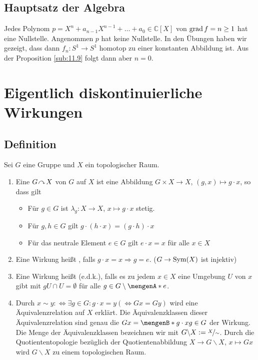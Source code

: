 \subsection{Hauptsatz der Algebra} %
\label{sub:1121}
Jedes Polynom $p = X^n + a_{n-1} X^{n-1} + \ldots  + a_0 \in \mathds{C}[X]$ von $\operatorname{grad} f = n \ge 1$ hat eine Nullstelle.
Angenommen $p$ hat keine Nullstelle. In den Übungen haben wir gezeigt,
dass dann $f_n : S^1 \to S^1$ homotop zu einer konstanten Abbildung ist. Aus der Proposition 
\ref{sub:11.9} folgt dann aber $n=0$. \bewende
\newpage

\section{Eigentlich diskontinuierliche Wirkungen} %
\label{sec:12}

\subsection[Definition: Eigentlich diskontinuierliche Wirkung]{Definition} %
\label{sub:12.1}
Sei $G$ eine Gruppe und $X$ ein topologischer Raum.
\begin{enumerate}[(1)]
	\item Eine  $G \!\curvearrowright\! X$ von $G$ auf $X$ ist eine Abbildung $G \times X \to X$, $(g,x) \mapsto g \cdot x$, so dass gilt
	\begin{itemize}
		\item Für $g \in G$ ist $\lambda_g : X \to X$, $x \mapsto g \cdot x$ stetig.
		\item Für $g,h \in G$ gilt $g \cdot (h \cdot x)= (g \cdot h) \cdot x$
		\item Für das neutrale Element $e \in G$ gilt $e \cdot x = x$ für alle $x \in X$
	\end{itemize}
	\item Eine Wirkung heißt , falls $g \cdot x = x \Rightarrow g = e$. \hfill {\color{gray} ($G \to \operatorname{Sym}(X)$ ist injektiv)}
	\item Eine Wirkung heißt  (e.d.k.), falls es zu jedem $x \in X$ eine Umgebung $U$ von $x$
	gibt mit $g U\cap U = \emptyset$ für alle $g \in G \setminus \set{e}$.
	\item Durch $x \sim y :\Leftrightarrow \exists g \in G : g \cdot x = y (\Leftrightarrow G x = G y)$ wird eine 
	Äquivalenzrelation auf $X$ erklärt. Die Äquivalenzklassen dieser Äquivalenzrelation sind genau die  $Gx =\set[g\cdot x]{g \in G}$ der Wirkung.
	Die Menge der Äquivalenzklassen bezeichnen wir mit $G \backslash X := \nicefrac{X}{\sim}$. Durch die Quotiententopologie bezüglich der Quotientenabbildung 
	$X \to G\backslash X$, $x \mapsto G x$ wird $G \backslash X$ zu einem topologischen Raum.
\end{enumerate}

